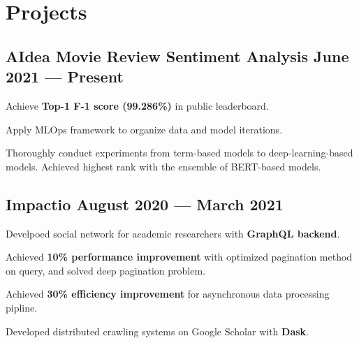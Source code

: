 \section{Projects}



\subsection*{AIdea Movie Review Sentiment Analysis \hfill June 2021 --- Present} 
\begin{zitemize}
    \item Achieve \textbf{Top-1 F-1 score (99.286\%)} in public leaderboard.
    \item Apply MLOps framework to organize data and model iterations.
    \item Thoroughly conduct experiments from term-based models to deep-learning-based models. Achieved highest rank with the ensemble of BERT-based models.
\end{zitemize}


\subsection*{Impactio \hfill August 2020 --- March 2021} 
    \begin{zitemize}
        \item Develpoed social network for academic researchers with \textbf{GraphQL backend}.
        \item Achieved \textbf{10\% performance improvement} with optimized pagination method on query, and solved deep pagination problem.
        \item Achieved \textbf{30\% efficiency improvement} for asynchronous data processing pipline.
        \item Developed distributed crawling systems on Google Scholar with \textbf{Dask}.
    \end{zitemize}


